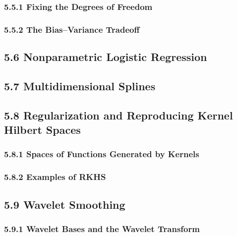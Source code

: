 \documentclass[11pt]{article}
\begin{document}
\subsubsection{5.5.1 Fixing the Degrees of
Freedom}\label{fixing-the-degrees-of-freedom}

\subsubsection{5.5.2 The Bias--Variance
Tradeoff}\label{the-biasvariance-tradeoff}

\subsection{5.6 Nonparametric Logistic
Regression}\label{nonparametric-logistic-regression}

\subsection{5.7 Multidimensional
Splines}\label{multidimensional-splines}

\subsection{5.8 Regularization and Reproducing Kernel Hilbert
Spaces}\label{regularization-and-reproducing-kernel-hilbert-spaces}

\subsubsection{5.8.1 Spaces of Functions Generated by
Kernels}\label{spaces-of-functions-generated-by-kernels}

\subsubsection{5.8.2 Examples of RKHS}\label{examples-of-rkhs}

\subsection{5.9 Wavelet Smoothing}\label{wavelet-smoothing}

\subsubsection{5.9.1 Wavelet Bases and the Wavelet
Transform}\label{wavelet-bases-and-the-wavelet-transform}
\end{document}
